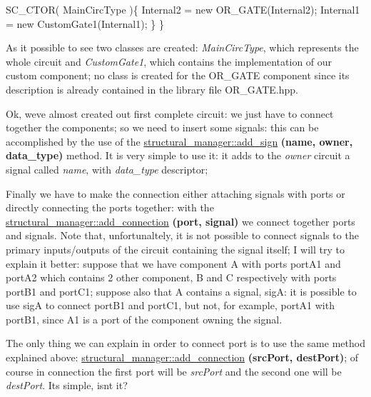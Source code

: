 \begin{DoxyItemize}
\begin{DoxyCode}
    SC\_CTOR( MainCircType )\{
      Internal2 = \textcolor{keyword}{new} OR\_GATE(Internal2);
      Internal1 = \textcolor{keyword}{new} CustomGate1(Internal1);
    \}
\}
\end{DoxyCode}
 As it possible to see two classes are created\+: {\itshape Main\+Circ\+Type}, which represents the whole circuit and {\itshape Custom\+Gate1}, which contains the implementation of our custom component; no class is created for the O\+R\+\_\+\+G\+A\+TE component since its description is already contained in the library file O\+R\+\_\+\+G\+A\+T\+E.\+hpp.
\item Ok, we\textquotesingle{}ve almost created out first complete circuit\+: we just have to connect together the components; so we need to insert some signals\+: this can be accomplished by the use of the \hyperlink{classstructural__manager_a4a530daa9384ecd10119e11500bc3cd8}{structural\+\_\+manager\+::add\+\_\+sign} {\bfseries (name, owner, data\+\_\+type)} method. It is very simple to use it\+: it adds to the {\itshape owner} circuit a signal called {\itshape name}, with {\itshape data\+\_\+type} descriptor;
\item Finally we have to make the connection either attaching signals with ports or directly connecting the ports together\+: with the \hyperlink{classstructural__manager_a7e4096354c807a693c242cf296ec2d6d}{structural\+\_\+manager\+::add\+\_\+connection} {\bfseries (port, signal)} we connect together ports and signals. Note that, unfortunaltely, it is not possible to connect signals to the primary inputs/outputs of the circuit containing the signal itself; I will try to explain it better\+: suppose that we have component A with ports port\+A1 and port\+A2 which contains 2 other component, B and C respectively with ports port\+B1 and port\+C1; suppose also that A contains a signal, sigA\+: it is possible to use sigA to connect port\+B1 and port\+C1, but not, for example, port\+A1 with port\+B1, since A1 is a port of the component owning the signal.
\item The only thing we can explain in order to connect port is to use the same method explained above\+: \hyperlink{classstructural__manager_a7e4096354c807a693c242cf296ec2d6d}{structural\+\_\+manager\+::add\+\_\+connection} {\bfseries (src\+Port, dest\+Port)}; of course in connection the first port will be {\itshape src\+Port} and the second one will be {\itshape dest\+Port}. It\textquotesingle{}s simple, isn\textquotesingle{}t it?
\end{DoxyItemize}

